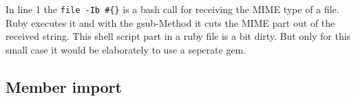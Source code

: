 	
In line 1 the \texttt{file -Ib \#\{\@filename\}} is a bash call for receiving the MIME type of a file. Ruby executes it and with the gsub-Method it cuts the MIME part out of the received string. This shell script part in a ruby file is a bit dirty. But only for this small case it would be elaborately to use a seperate gem.


\subsection{Member import}


